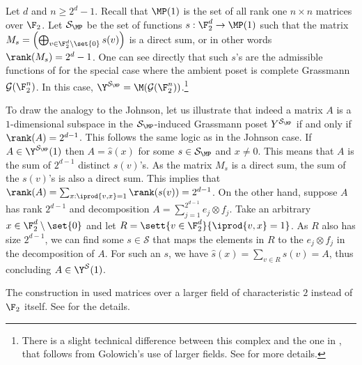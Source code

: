 \begin{example} \label{ex:matrices}
    Let \(d\) and \(n \geq 2^d-1\). Recall that \(\MP(1)\) is the set of all rank one \(n \times n\) matrices over \(\F_2\). Let \(\mathcal{S}_{\MP}\) be the set of functions \(s:\F_2^d \to \MP(1)\) such that the matrix \(M_s = \left (\bigoplus_{v \in \F_2^d \setminus \set{0}}s(v) \right )\) is a direct sum, or in other words \(\rank(M_s) = 2^d - 1\). One can see directly that such \(s\)'s are the admissible functions of  for the special case where the ambient poset is complete Grassmann \(\mathcal{G}(\F_2^n)\). In this case, \(\Y^{\mathcal{S}_{\MP}} = \M(\mathcal{G}(\F_2^n))\).\footnote{There is a slight technical difference between this complex and the one in \cite{Golowich2023}, that follows from Golowich's use of larger fields. See \cite{Golowich2023} for more details.}
    
    To draw the analogy to the Johnson, let us illustrate that indeed a matrix \(A\) is a $1$-dimensional subspace in the $\mathcal{S}_{\MP}$-induced Grassmann poset \(Y^{\mathcal{S}_{\MP}}\) if and only if \(\rank(A) = 2^{d-1}\). This follows the same logic as in the Johnson case. If \(A \in \Y^{\mathcal{S}_{\MP}}(1)\) then \(A = \widehat{s}(x)\) for some \(s \in \mathcal{S}_{\MP}\) and \(x\ne 0\). This means that \(A\) is the sum of \(2^{d-1}\) distinct \(s(v)\)'s. As the matrix \(M_s\) is a direct sum, the sum of the \(s(v)\)'s is also a direct sum. This implies that \(\rank(A) = \sum_{x: \iprod{v,x}=1}\rank(s(v)) = 2^{d-1}\). On the other hand, suppose \(A\) has rank \(2^{d-1}\) and decomposition \(A = \sum_{j=1}^{2^{d-1}} e_j \otimes f_j\). Take an arbitrary \(x \in \F_2^d \setminus \set{0}\) and let \(R = \sett{v \in \F_2^d}{\iprod{v,x}=1}\). As \(R\) also has size \(2^{d-1}\), we can find some \(s \in \mathcal{S}\) that maps the elements in \(R\) to the \(e_j \otimes f_j\) in the decomposition of \(A\). For such an \(s\), we have \(\widehat{s}(x) = \sum_{v \in R}s(v) = A\), thus concluding \(A \in \Y^{\mathcal{S}}(1)\).
\end{example}
The construction in \cite{Golowich2023} used matrices over a larger field of characteristic \(2\) instead of \(\F_2\) itself. See \cite{Golowich2023} for the details.

